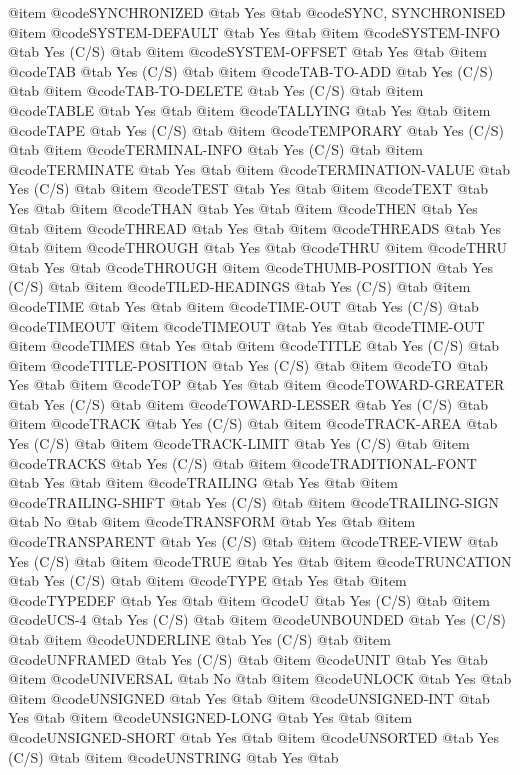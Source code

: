 @item @code{SYNCHRONIZED} @tab Yes @tab @code{SYNC, SYNCHRONISED}
@item @code{SYSTEM-DEFAULT} @tab Yes @tab 
@item @code{SYSTEM-INFO} @tab Yes	(C/S) @tab 
@item @code{SYSTEM-OFFSET} @tab Yes @tab 
@item @code{TAB} @tab Yes	(C/S) @tab 
@item @code{TAB-TO-ADD} @tab Yes	(C/S) @tab 
@item @code{TAB-TO-DELETE} @tab Yes	(C/S) @tab 
@item @code{TABLE} @tab Yes @tab 
@item @code{TALLYING} @tab Yes @tab 
@item @code{TAPE} @tab Yes	(C/S) @tab 
@item @code{TEMPORARY} @tab Yes	(C/S) @tab 
@item @code{TERMINAL-INFO} @tab Yes	(C/S) @tab 
@item @code{TERMINATE} @tab Yes @tab 
@item @code{TERMINATION-VALUE} @tab Yes	(C/S) @tab 
@item @code{TEST} @tab Yes @tab 
@item @code{TEXT} @tab Yes @tab 
@item @code{THAN} @tab Yes @tab 
@item @code{THEN} @tab Yes @tab 
@item @code{THREAD} @tab Yes @tab 
@item @code{THREADS} @tab Yes @tab 
@item @code{THROUGH} @tab Yes @tab @code{THRU}
@item @code{THRU} @tab Yes @tab @code{THROUGH}
@item @code{THUMB-POSITION} @tab Yes	(C/S) @tab 
@item @code{TILED-HEADINGS} @tab Yes	(C/S) @tab 
@item @code{TIME} @tab Yes @tab 
@item @code{TIME-OUT} @tab Yes	(C/S) @tab @code{TIMEOUT}
@item @code{TIMEOUT} @tab Yes @tab @code{TIME-OUT}
@item @code{TIMES} @tab Yes @tab 
@item @code{TITLE} @tab Yes	(C/S) @tab 
@item @code{TITLE-POSITION} @tab Yes	(C/S) @tab 
@item @code{TO} @tab Yes @tab 
@item @code{TOP} @tab Yes @tab 
@item @code{TOWARD-GREATER} @tab Yes	(C/S) @tab 
@item @code{TOWARD-LESSER} @tab Yes	(C/S) @tab 
@item @code{TRACK} @tab Yes	(C/S) @tab 
@item @code{TRACK-AREA} @tab Yes	(C/S) @tab 
@item @code{TRACK-LIMIT} @tab Yes	(C/S) @tab 
@item @code{TRACKS} @tab Yes	(C/S) @tab 
@item @code{TRADITIONAL-FONT} @tab Yes @tab 
@item @code{TRAILING} @tab Yes @tab 
@item @code{TRAILING-SHIFT} @tab Yes	(C/S) @tab 
@item @code{TRAILING-SIGN} @tab No @tab 
@item @code{TRANSFORM} @tab Yes @tab 
@item @code{TRANSPARENT} @tab Yes	(C/S) @tab 
@item @code{TREE-VIEW} @tab Yes	(C/S) @tab 
@item @code{TRUE} @tab Yes @tab 
@item @code{TRUNCATION} @tab Yes	(C/S) @tab 
@item @code{TYPE} @tab Yes @tab 
@item @code{TYPEDEF} @tab Yes @tab 
@item @code{U} @tab Yes	(C/S) @tab 
@item @code{UCS-4} @tab Yes	(C/S) @tab 
@item @code{UNBOUNDED} @tab Yes	(C/S) @tab 
@item @code{UNDERLINE} @tab Yes	(C/S) @tab 
@item @code{UNFRAMED} @tab Yes	(C/S) @tab 
@item @code{UNIT} @tab Yes @tab 
@item @code{UNIVERSAL} @tab No @tab 
@item @code{UNLOCK} @tab Yes @tab 
@item @code{UNSIGNED} @tab Yes @tab 
@item @code{UNSIGNED-INT} @tab Yes @tab 
@item @code{UNSIGNED-LONG} @tab Yes @tab 
@item @code{UNSIGNED-SHORT} @tab Yes @tab 
@item @code{UNSORTED} @tab Yes	(C/S) @tab 
@item @code{UNSTRING} @tab Yes @tab 
